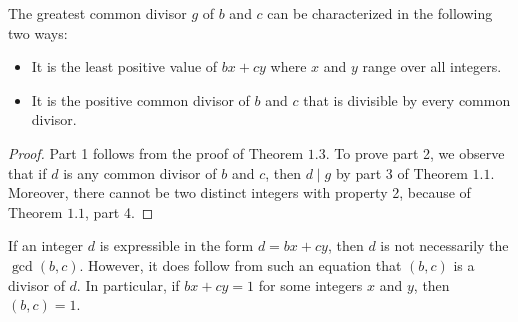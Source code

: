\documentclass[11pt]{article}
\begin{document}
\begin{theorem}
    The greatest common divisor \(g\) of \(b\) and \(c\) can be characterized in the following two ways:
    \begin{itemize}
        \item It is the least positive value of \(bx + cy\) where \(x\) and \(y\) range over
              all integers.
        \item It is the positive common divisor of \(b\) and \(c\) that is divisible by every
              common divisor.
    \end{itemize}
\end{theorem}

\begin{proof}
    Part 1 follows from the proof of Theorem \(1.3\). To prove part 2, we observe that if \(d\) is any common divisor of \(b\) and \(c\), then \(d \mid g\) by part 3 of Theorem \(1.1\). Moreover, there cannot be two distinct integers with property 2, because of Theorem \(1.1\), part 4.
\end{proof}

\begin{remark}
    If an integer \(d\) is expressible in the form \(d = bx + cy\), then \(d\) is not
    necessarily the \(\gcd(b, c)\). However, it does follow from such an equation
    that \((b, c)\) is a divisor of \(d\). In particular, if \(bx + cy = 1\) for some integers
    \(x\) and \(y\), then \((b, c) = 1\).
\end{remark}
\end{document}
